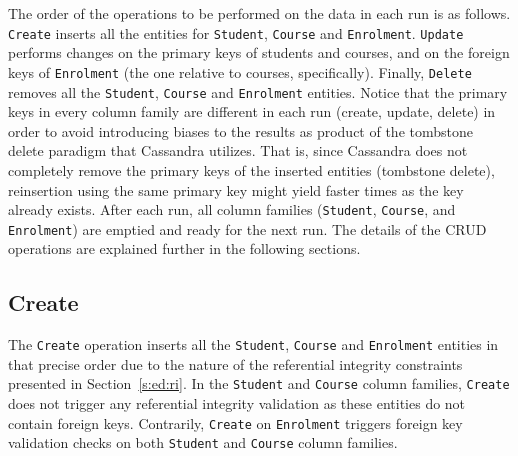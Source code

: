 		
The order of the operations to be performed on the data in each run is as
follows.
\texttt{Create} inserts all the entities for \texttt{Student},  \texttt{Course}
and \texttt{Enrolment}.  \texttt{Update} performs changes on the primary keys of
students and courses,  and on the foreign keys of \texttt{Enrolment} (the one
relative to courses,  specifically).  Finally,  \texttt{Delete} removes all the
\texttt{Student},  \texttt{Course} and \texttt{Enrolment} entities. 
Notice that the primary keys in every column family are different in each run
(create,  update,  delete) in order to avoid introducing biases to the results as
product of the tombstone delete paradigm that Cassandra utilizes.  That is,  since
Cassandra does not completely  remove the primary keys of the inserted entities
(tombstone delete),  reinsertion  using the same primary key might yield faster
times as the key already exists.  After each run,  all column families
(\texttt{Student},  \texttt{Course},  and \texttt{Enrolment}) are emptied and
ready for the next run.   The details  of the \ac{CRUD} operations are explained
further in the following sections. 
		

	
\subsection{Create}
The \texttt{Create} operation inserts all the
\texttt{Student},  \texttt{Course} and \texttt{Enrolment} entities in that
precise order due to the nature of the referential integrity constraints
presented in Section~\ref{s:ed:ri}.   In the \texttt{Student} and
 \texttt{Course} column families,  \texttt{Create} does not trigger any
 referential integrity validation as these entities do not contain foreign keys. 
 Contrarily,  \texttt{Create} on \texttt{Enrolment} triggers foreign key
 validation checks on both \texttt{Student} and \texttt{Course} column families. 
		
